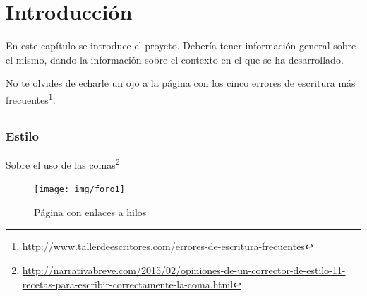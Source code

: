 \documentclass[a4paper, 12pt]{book}
\begin{document}
\tableofcontents 
\cleardoublepage
\listoffigures %



\cleardoublepage
\chapter{Introducción}
\label{sec:intro} %

En este capítulo se introduce el proyeto. Debería tener información general sobre 
el mismo, dando la información sobre el contexto en el que se ha desarrollado.

No te olvides de echarle un ojo a la página con los cinco errores de escritura más frecuentes\footnote{\url{http://www.tallerdeescritores.com/errores-de-escritura-frecuentes}}.

\section{}
\label{sec:}

\subsection{Estilo}
\label{subsec:estilo}

Sobre el uso de las comas\footnote{\url{http://narrativabreve.com/2015/02/opiniones-de-un-corrector-de-estilo-11-recetas-para-escribir-correctamente-la-coma.html}}

 \begin{figure}
    \centering
    \texttt{[image: img/foro1]}
    \caption{Página con enlaces a hilos}
    \label{figura:foro_hilos}
 \end{figure}
\end{document}
